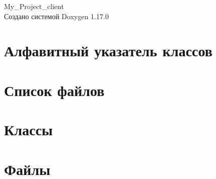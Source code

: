 \documentclass[twoside]{book}
\newcommand{\+}{\discretionary{\mbox{\scriptsize$\hookleftarrow$}}{}{}}
\newcommand{\clearemptydoublepage}{%
    \newpage{\pagestyle{empty}\cleardoublepage}%
  }
\begin{document}
  \raggedbottom
    \hypersetup{pageanchor=false,
                bookmarksnumbered=true,
                pdfencoding=unicode
               }
  \begin{titlepage}
  \vspace*{7cm}
  \begin{center}%
  {\Large My\+\_\+\+Project\+\_\+client}\\
  \vspace*{1cm}
  {\large Создано системой Doxygen 1.17.0}\\
  \end{center}
  \end{titlepage}
  \clearemptydoublepage
  \tableofcontents
  \clearemptydoublepage
  \hypersetup{pageanchor=true}

\chapter{Алфавитный указатель классов}

\chapter{Список файлов}

\chapter{Классы}





\chapter{Файлы}











  \backmatter
  \newpage
  \clearemptydoublepage
  \printindex
\end{document}
